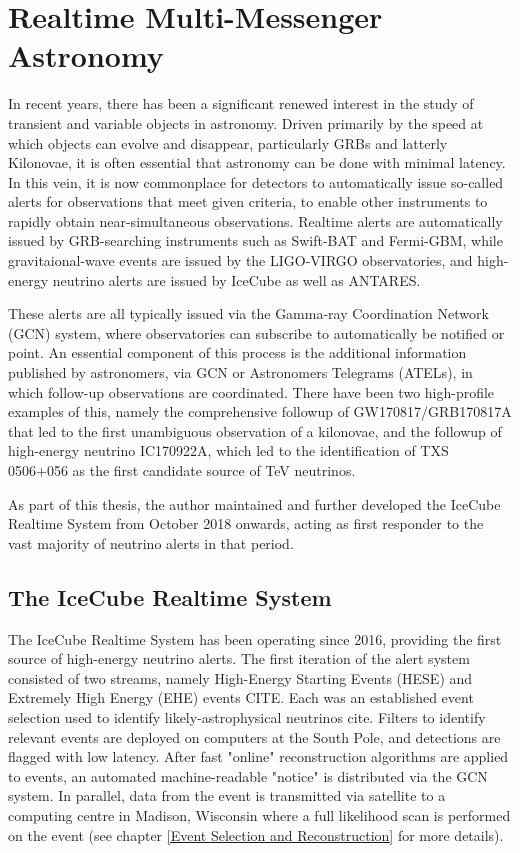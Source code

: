\setchapterpreamble[u]{\margintoc}
\chapter{Realtime Multi-Messenger Astronomy}

In recent years, there has been a significant renewed interest in the study of transient and variable objects in astronomy. Driven primarily by the speed at which objects can evolve and disappear, particularly GRBs and latterly Kilonovae, it is often essential that astronomy can be done with minimal latency. In this vein, it is now commonplace for detectors to automatically issue so-called alerts for observations that meet given criteria, to enable other instruments to rapidly obtain near-simultaneous observations. Realtime alerts are automatically issued by GRB-searching instruments such as Swift-BAT and Fermi-GBM, while gravitaional-wave events are issued by the LIGO-VIRGO observatories, and high-energy neutrino alerts are issued by IceCube as well as ANTARES.

These alerts are all typically issued via  the Gamma-ray Coordination Network (GCN) system, where observatories can subscribe to automatically be notified or point.  An essential component of this process is the additional information published by astronomers, via GCN or Astronomers Telegrams (ATELs), in which follow-up observations are coordinated. There have been two high-profile examples of this, namely the comprehensive followup of GW170817/GRB170817A that led to the first unambiguous observation of a kilonovae, and the followup of high-energy neutrino IC170922A, which led to the identification of TXS 0506+056 as the first candidate source of TeV neutrinos. 

As part of this thesis, the author maintained and further developed the IceCube Realtime System from October 2018 onwards, acting as first responder to the vast majority of neutrino alerts in that period.

\section{The IceCube Realtime System}
The IceCube Realtime System has been operating since 2016, providing the first source of high-energy neutrino alerts. The first iteration of the alert system consisted of two streams, namely High-Energy Starting Events (HESE) and Extremely High Energy (EHE) events CITE. Each was an established event selection used to identify likely-astrophysical neutrinos cite. Filters to identify relevant events are deployed on computers at the South Pole, and detections are flagged  with low latency. After fast "online" reconstruction algorithms are applied to events, an automated machine-readable "notice" is distributed via the GCN system. In parallel, data from the event is transmitted via satellite to a computing centre in Madison, Wisconsin where a full likelihood scan is performed on the event (see chapter \ref{Event Selection and Reconstruction} for more details). 

